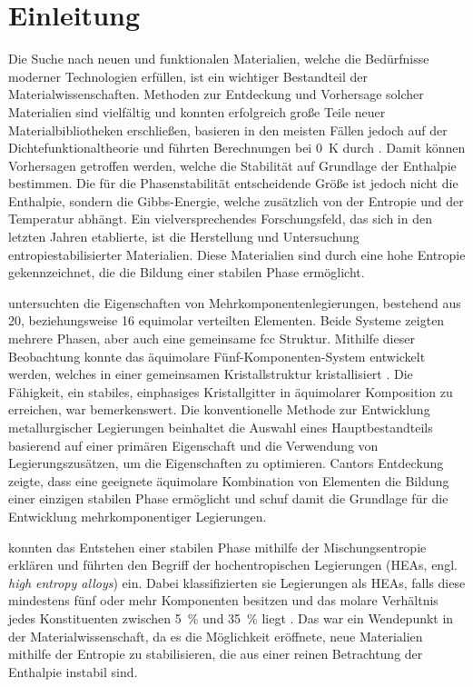 \section{Einleitung}\label{sec:einleitung}
Die Suche nach neuen und funktionalen Materialien, welche die Bedürfnisse moderner Technologien erfüllen, ist ein
wichtiger Bestandteil der Materialwissenschaften.
Methoden zur Entdeckung und Vorhersage solcher Materialien sind vielfältig und konnten erfolgreich große Teile
neuer Materialbibliotheken erschließen, basieren in den meisten Fällen jedoch auf der Dichtefunktionaltheorie und führten
Berechnungen bei \qty{0}{\kelvin} durch \autocite{Rost2015}.
Damit können Vorhersagen getroffen werden, welche die Stabilität auf Grundlage der Enthalpie bestimmen.
Die für die Phasenstabilität entscheidende Größe ist jedoch nicht die Enthalpie, sondern die Gibbs-Energie,
welche zusätzlich von der Entropie und der Temperatur abhängt.
Ein vielversprechendes Forschungsfeld, das sich in den letzten Jahren etablierte, ist die Herstellung und
Untersuchung entropiestabilisierter Materialien.
Diese Materialien sind durch eine hohe Entropie gekennzeichnet, die die Bildung einer stabilen Phase ermöglicht.

 untersuchten die Eigenschaften von Mehrkomponentenlegierungen, bestehend aus 20,
beziehungsweise 16 equimolar verteilten Elementen.
Beide Systeme zeigten mehrere Phasen, aber auch eine gemeinsame fcc Struktur.
Mithilfe dieser Beobachtung konnte das äquimolare Fünf-Komponenten-System  entwickelt werden, welches in
einer gemeinsamen Kristallstruktur kristallisiert \autocite{cantor}.
Die Fähigkeit, ein stabiles, einphasiges Kristallgitter in äquimolarer Komposition zu erreichen, war bemerkenswert.
Die konventionelle Methode zur Entwicklung metallurgischer Legierungen beinhaltet die Auswahl eines Hauptbestandteils
basierend auf einer primären Eigenschaft und die Verwendung von Legierungszusätzen, um die Eigenschaften
zu optimieren.
Cantors Entdeckung zeigte, dass eine geeignete äquimolare Kombination von Elementen die Bildung einer einzigen stabilen
Phase ermöglicht und schuf damit die Grundlage für die Entwicklung mehrkomponentiger Legierungen.

 konnten das Entstehen einer stabilen Phase mithilfe der Mischungsentropie erklären und führten den
Begriff der hochentropischen Legierungen (HEAs, engl. \textit{high entropy alloys}) ein.
Dabei klassifizierten sie Legierungen als HEAs, falls diese mindestens fünf oder mehr Komponenten besitzen
und das molare Verhältnis jedes Konstituenten zwischen \qty{5}{\percent} und \qty{35}{\percent} liegt \autocite{yeh}.
Das war ein Wendepunkt in der Materialwissenschaft, da es die Möglichkeit eröffnete, neue Materialien mithilfe
der Entropie zu stabilisieren, die aus einer reinen Betrachtung der Enthalpie instabil sind.

